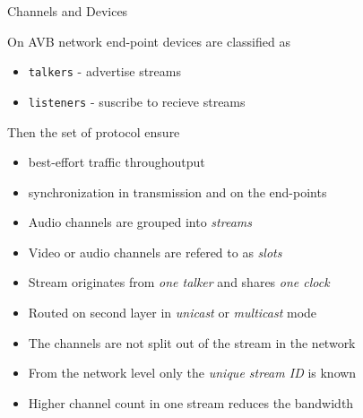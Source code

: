 \documentclass{beamer}
\begin{document}
\begin{frame}[allowframebreaks]{ Channels and Devices }

On AVB network end-point devices are classified as
\begin{itemize}
	\item \texttt{talkers} - advertise streams
	\item \texttt{listeners} - suscribe to recieve streams
\end{itemize}
Then the set of protocol ensure
\begin{itemize}
	\item best-effort traffic throughoutput
	\item synchronization in transmission and on the end-points
\end{itemize}

\break

\begin{itemize}

\item Audio channels are grouped into \emph{streams}
\item Video or audio channels are refered to as \emph{slots}
\item Stream originates from \emph{one talker} and shares \emph{one clock}
\item Routed on second layer in \emph{unicast} or \emph{multicast} mode
\item The channels are not split out of the stream in the network
\item From the network level only the \emph{unique stream ID} is known
\item Higher channel count in one stream reduces the bandwidth

\end{itemize}

\end{frame}

\end{document}
